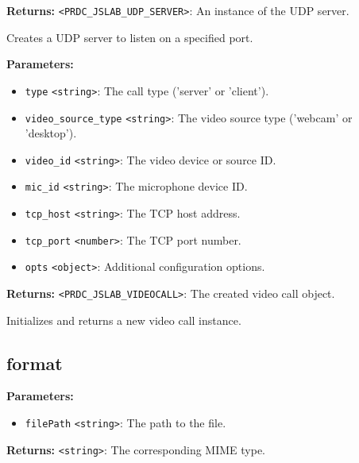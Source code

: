 \documentclass[12pt,a4paper]{article}
\begin{document}
\noindent \textbf{Returns:} \texttt{<PRDC\_JSLAB\_UDP\_SERVER>}: An instance of the UDP server.

\noindent Creates a UDP server to listen on a specified port.

\vspace{5mm}
\noindent {}


\noindent \textbf{Parameters:}
\begin{itemize}
  \item \texttt{type} \texttt{<string>}: The call type ('server' or 'client').
  \item \texttt{video\_source\_type} \texttt{<string>}: The video source type ('webcam' or 'desktop').
  \item \texttt{video\_id} \texttt{<string>}: The video device or source ID.
  \item \texttt{mic\_id} \texttt{<string>}: The microphone device ID.
  \item \texttt{tcp\_host} \texttt{<string>}: The TCP host address.
  \item \texttt{tcp\_port} \texttt{<number>}: The TCP port number.
  \item \texttt{opts} \texttt{<object>}: Additional configuration options.
\end{itemize}

\noindent \textbf{Returns:} \texttt{<PRDC\_JSLAB\_VIDEOCALL>}: The created video call object.

\noindent Initializes and returns a new video call instance.


\subsection{format}
\vspace{5mm}
\noindent {}


\noindent \textbf{Parameters:}
\begin{itemize}
  \item \texttt{filePath} \texttt{<string>}: The path to the file.
\end{itemize}

\noindent \textbf{Returns:} \texttt{<string>}: The corresponding MIME type.
\end{document}
